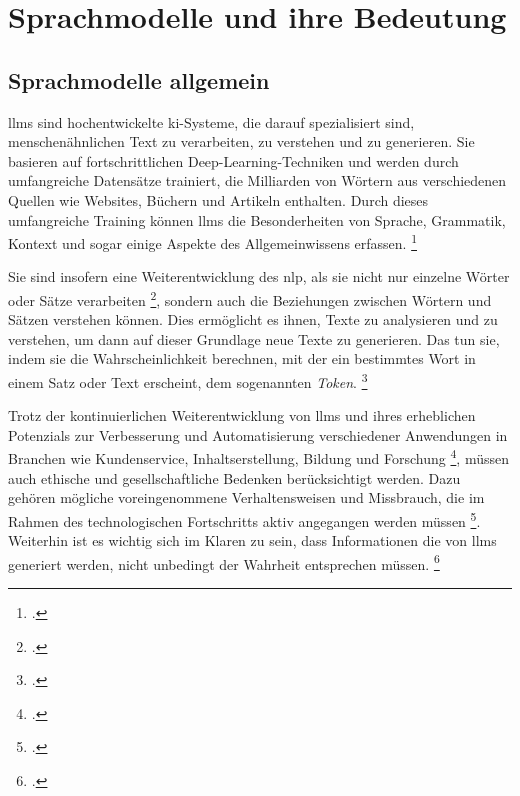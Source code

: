 \section{Sprachmodelle und ihre Bedeutung} \label{sec:sprachmodelle}
\subsection{Sprachmodelle allgemein} \label{sec:sprachmodelle_allgemein}
\acp{llm} sind hochentwickelte \ac{ki}-Systeme, die darauf spezialisiert sind, menschenähnlichen Text zu verarbeiten, zu verstehen und zu generieren.
Sie basieren auf fortschrittlichen Deep-Learning-Techniken und werden durch umfangreiche Datensätze trainiert, die Milliarden von Wörtern aus verschiedenen Quellen wie Websites, Büchern und Artikeln enthalten.
Durch dieses umfangreiche Training können \acp{llm} die Besonderheiten von Sprache, Grammatik, Kontext und sogar einige Aspekte des Allgemeinwissens erfassen. \footcite[Vgl.][S. 93 ff.]{Taulli2023}

Sie sind insofern eine Weiterentwicklung des \ac{nlp}, als sie nicht nur einzelne Wörter oder Sätze verarbeiten \footcite[Vgl.][S. 245 ff.]{NLP_2008}, sondern auch die Beziehungen zwischen Wörtern und Sätzen verstehen können.
Dies ermöglicht es ihnen, Texte zu analysieren und zu verstehen, um dann auf dieser Grundlage neue Texte zu generieren.
Das tun sie, indem sie die Wahrscheinlichkeit berechnen, mit der ein bestimmtes Wort in einem Satz oder Text erscheint, dem sogenannten \textit{Token}. \footcite[Vgl.][]{google:llm}

Trotz der kontinuierlichen Weiterentwicklung von \acp{llm} und ihres erheblichen Potenzials zur Verbesserung und Automatisierung verschiedener Anwendungen in Branchen wie Kundenservice, Inhaltserstellung, Bildung und Forschung \footcite[Vgl.][S. 4 ff.]{tamkin2021understanding}, müssen auch ethische und gesellschaftliche Bedenken berücksichtigt werden. Dazu gehören mögliche voreingenommene Verhaltensweisen und Missbrauch, die im Rahmen des technologischen Fortschritts aktiv angegangen werden müssen \footcite[Vgl.][S. 1]{Tokayev_2023}.
Weiterhin ist es wichtig sich im Klaren zu sein, dass Informationen die von \acp{llm} generiert werden, nicht unbedingt der Wahrheit entsprechen müssen. \footcite[Vgl.][S. 217 f.]{10.1145/3531146.3533088}

